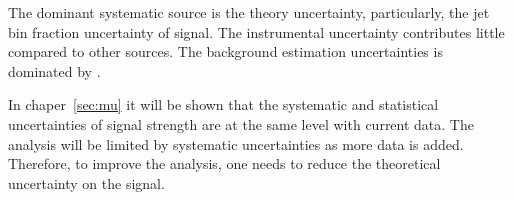 The dominant systematic source is the theory uncertainty, particularly, 
the jet bin fraction uncertainty of signal. 
The instrumental uncertainty contributes little compared to other sources. 
The background estimation uncertainties is dominated by \Wjets.  

In chaper~\ref{sec:mu} it will be shown that the systematic 
and statistical uncertainties of signal strength are at the same level 
with current data. The analysis will be limited by systematic 
uncertainties as more data is added. Therefore, to improve the analysis, 
one needs to reduce the theoretical uncertainty on the signal.
